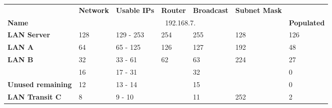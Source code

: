 \documentclass[11pt,a4paper]{report}
\begin{document}
\begin{table}[]
\begin{center}
\begin{tabular}{lllllll}
\hline
                                               & \textbf{Network}           & \textbf{Usable IPs} & \textbf{Router} & \multicolumn{1}{c}{\textbf{Broadcast}} & \multicolumn{1}{c}{\textbf{Subnet Mask}} &                                      \\ \cline{2-6}
\multirow{-2}{*}{\textbf{Name}}                & \multicolumn{5}{c}{192.168.7.}                                                                                                                         & \multirow{-2}{*}{\textbf{Populated}} \\ \hline
\cellcolor[HTML]{F4B084}\textbf{LAN Server}    & 128                        & 129 - 253           & 254             & 255                                    & 128                                      & 126                                  \\ \hline
\cellcolor[HTML]{A9D08E}\textbf{LAN A}         & 64                         & 65 - 125            & 126             & 127                                    & 192                                      & 48                                   \\ \hline
\cellcolor[HTML]{FFD966}\textbf{LAN B}         & 32                         & 33 - 61             & 62              & 63                                     & 224                                      & 27                                   \\ \hline
                                               & \cellcolor[HTML]{BFBFBF}16 & 17 - 31             &                 & 32                                     &                                          & 0                                    \\ \cline{2-7}
\multirow{-2}{*}{\textbf{Unused remaining}}    & \cellcolor[HTML]{C09FE5}12 & 13 - 14             &                 & 15                                     &                                          & 0                                    \\ \hline
\cellcolor[HTML]{C09FE5}\textbf{LAN Transit C} & 8                          & 9 - 10              &                 & 11                                     & 252                                      & 2                                    \\ \hline

\end{tabular}
\end{center}
\end{table}
\end{document}

